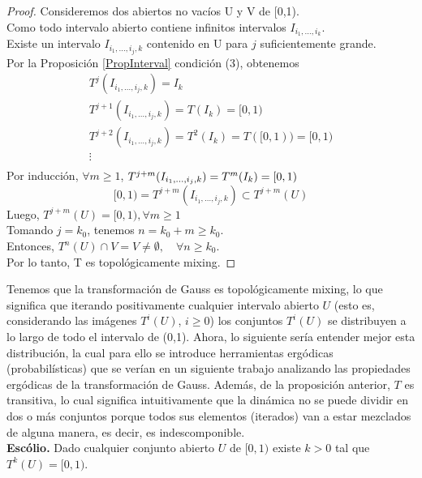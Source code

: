 \documentclass[12pt]{report}
\begin{document}
\begin{proof}
Consideremos dos abiertos no vacíos U y V de [0,1).
\\
Como todo intervalo abierto contiene infinitos intervalos $I_{i_{1}, \ldots, i_{k}}$.
\\
Existe un intervalo $I_{i_{1}, \ldots, i_{j}, k}$ contenido en U para $j$ suficientemente grande.
\\
Por la Proposición \ref{PropInterval} condición (3), obtenemos
\\
$$
\begin{array}{l}
T^{j}(I_{i_{1}, \ldots, i_{j},k})=I_{k}\\
T^{j+1}(I_{i_{1}, \ldots, i_{j},k})=T(I_{k})=[0,1)\\
T^{j+2}(I_{i_{1}, \ldots, i_{j},k})=T^{2}(I_{k})=T([0,1))=[0,1)\\
\vdots\\
\end{array}
$$
Por inducción, $\forall m\geq1$, $T^{j+m}(I_{i_{1}, \ldots, i_{j},k})=T^{m}(I_{k})=[0,1)\\$
$$
[0,1)=T^{j+m}\left(I_{i_{1}, \ldots, i_{j},k}\right)\subset T^{j+m}(U)$$
Luego, $T^{j+m}(U)=[0,1), \forall m \geqslant 1$
\\
Tomando $j=k_{0}$, tenemos $n=k_{0}+m\geq k_{0}$.
\\
Entonces, $T^{n}(U) \cap V=V \neq \emptyset ,\quad \forall n\geq k_{0}$.
\\
Por lo tanto, T es topológicamente mixing.
\end{proof} 

Tenemos que la transformación de Gauss es topológicamente mixing, lo que significa que iterando positivamente cualquier intervalo abierto $U$ (esto es, considerando las imágenes $T^{i}(U)$, $i\geq0$) los conjuntos $T^{i}(U)$ se distribuyen a lo largo de todo el intervalo de (0,1). Ahora, lo siguiente sería entender mejor esta distribución, la cual para ello se introduce herramientas ergódicas (probabilísticas) que se verían en un siguiente trabajo analizando las propiedades ergódicas de la transformación de Gauss. Además, de la proposición anterior, $T$ es transitiva, lo cual significa intuitivamente que la dinámica no se puede dividir en dos o más conjuntos porque todos sus elementos (iterados) van a estar mezclados de alguna manera, es decir, es indescomponible.
\\

\textbf{Escólio.} Dado cualquier conjunto abierto $U$ de $[0,1)$ existe $k>0$ tal que $T^{k}(U)=[0,1)$.
\\
\end{document}
